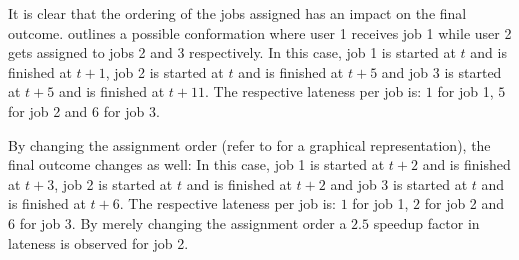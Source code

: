 It is clear that the ordering of the jobs assigned has an impact on the final outcome.  outlines a possible conformation where user 1 receives job 1 while user 2 gets assigned to jobs 2 and 3 respectively. In this case, job 1 is started at $t$ and is finished at $t+1$, job 2 is started at $t$ and is finished at $t+5$ and job 3 is started at $t+5$ and is finished at $t+11$. The respective lateness per job is: $1$ for job 1, $5$ for job 2 and $6$ for job $3$.

By changing the assignment order (refer to  for a graphical representation), the final outcome changes as well: In this case, job 1 is started at $t+2$ and is finished at $t+3$, job 2 is started at $t$ and is finished at $t+2$ and job 3 is started at $t$ and is finished at $t+6$. The respective lateness per job is: $1$ for job 1, $2$ for job 2 and $6$ for job $3$. By merely changing the assignment order a $2.5$ speedup factor in lateness is observed for job 2.

